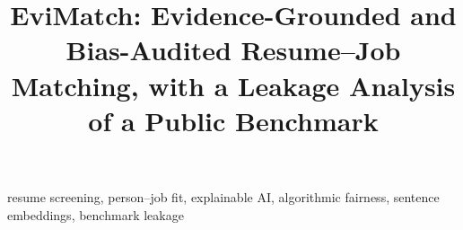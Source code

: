 \documentclass[conference]{IEEEtran}
\begin{document}
\title{EviMatch: Evidence-Grounded and Bias-Audited Resume--Job Matching, with a Leakage Analysis of a Public Benchmark}

\author{
}

\maketitle

\begin{abstract}

\end{abstract}

\begin{IEEEkeywords}
resume screening, person--job fit, explainable AI, algorithmic fairness, sentence embeddings, benchmark leakage
\end{IEEEkeywords}











\end{document}

